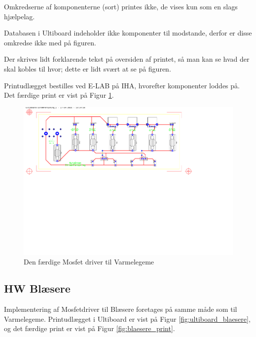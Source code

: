 Omkredserne af komponenterne (sort) printes ikke, de vises kun som en slags hjælpelag. 

Databasen i Ultiboard indeholder ikke komponenter til modstande, derfor er disse omkredse ikke med på figuren. 

Der skrives lidt forklarende tekst på oversiden af printet, så man kan se hvad der skal kobles til hvor; dette er lidt svært at se på figuren.
\newline

Printudlægget bestilles ved E-LAB på IHA, hvorefter komponenter loddes på.
Det færdige print er vist på Figur \ref{fig:varmelegeme_print}.

\begin{figure}[h]
\centering 
\includegraphics[width={\textwidth}, trim=0 0 0 0, clip=true] {../fig/ultiboard_stroemforsyning.pdf} %
\caption{Den færdige Mosfet driver til Varmelegeme}
\label{fig:varmelegeme_print}
\end{figure}

\clearpage

\subsection{HW Blæsere}

Implementering af Mosfetdriver til Blæsere foretages på samme måde som til Varmelegeme.
Printudlægget i Ultiboard er vist på Figur \ref{fig:ultiboard_blaesere}, og det færdige print er vist på Figur \ref{fig:blaesere_print}.

